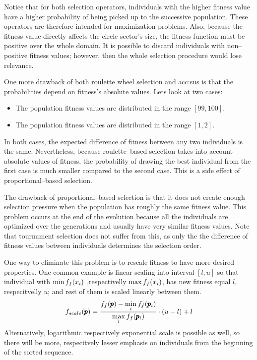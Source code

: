 Notice that for both selection operators, individuals with the higher fitness value have a higher probability of being picked up to the successive population. These operators are therefore intended for maximization problems. Also, because the fitness value directly affects the circle sector's size, the fitness function must be positive over the whole domain. It is possible to discard individuals with non--positive fitness values; however, then the whole selection procedure would lose relevance.

One more drawback of both roulette wheel selection and \acrshort{acc:sus} is that the probabilities depend on fitness's absolute values. Lets look at two cases:
\begin{itemize}
    \item The population fitness values are distributed in the range $\left[ 99,100 \right]$.
    \item The population fitness values are distributed in the range $\left[ 1, 2\right]$.
\end{itemize}
In both cases, the expected difference of fitness between any two individuals is the same. Nevertheless, because roulette--based selection takes into account absolute values of fitness, the probability of drawing the best individual from the first case is much smaller compared to the second case. This is a side effect of proportional--based selection.

The drawback of proportional--based selection is that it does not create enough selection pressure when the population has roughly the same fitness value. This problem occurs at the end of the evolution because all the individuals are optimized over the generations and usually have very similar fitness values. Note that tournament selection does not suffer from this, as only the the difference of fitness values between individuals determines the selection order.

One way to eliminate this problem is to rescale fitness to have more desired properties. One common example is linear scaling into interval $\left[ l,u \right]$ so that individual with $\min f_f(x_i)$ ,respectivelly $\max f_f(x_i)$, has new fitness equal $l$, respecitvelly $u$; and rest of them is scaled linearly between them. 
$$
f_{scale}(\pmb{p})=\frac{f_f(\pmb{p}) - \min\limits_{i}f_f(\pmb{p}_i)}{\max\limits_{i}f_f(\pmb{p}_i)}\cdot(u-l)+l 
$$
Alternatively, logarithmic respectively exponential scale is possible as well, so there will be more, respecitvely lesser emphasis on individuals from the beginning of the sorted sequence.


